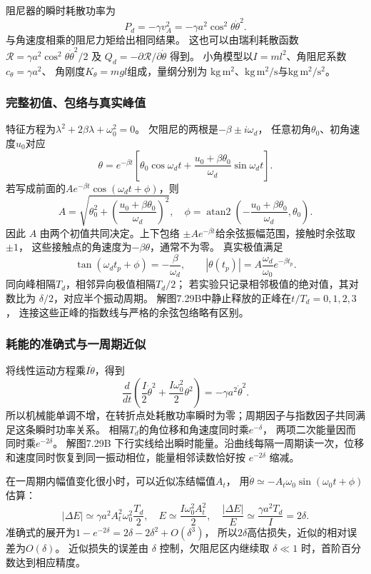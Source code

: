 \documentclass[UTF8,fontset=fandol,a4paper,11pt]{ctexart}
\begin{document}
阻尼器的瞬时耗散功率为
\[
P_d=-\gamma v_A^2=-\gamma a^2\cos^2\theta\dot\theta^2.
\]
与角速度相乘的阻尼力矩给出相同结果。
这也可以由瑞利耗散函数
$\mathcal R=\gamma a^2\cos^2\theta\dot\theta^2/2$
及 $Q_d=-\partial\mathcal R/\partial\dot\theta$ 得到。
小角模型以$I=ml^2$、角阻尼系数$c_\theta=\gamma a^2$、
角刚度$K_\theta=mgl$组成，量纲分别为
$\mathrm{kg\,m^2}$、$\mathrm{kg\,m^2/s}$与$\mathrm{kg\,m^2/s^2}$。

\subsubsection*{完整初值、包络与真实峰值}
特征方程为$\lambda^2+2\beta\lambda+\omega_0^2=0$。
欠阻尼的两根是$-\beta\pm i\omega_d$，
任意初角$\theta_0$、初角速度$u_0$对应
\[
\theta=e^{-\beta t}\left[
\theta_0\cos\omega_dt+\frac{u_0+\beta\theta_0}{\omega_d}\sin\omega_dt\right].
\]
若写成前面的$Ae^{-\beta t}\cos(\omega_dt+\phi)$，则
\[
A=\sqrt{\theta_0^2+\left(\frac{u_0+\beta\theta_0}{\omega_d}\right)^2},
\quad\phi=\operatorname{atan2}\left(-\frac{u_0+\beta\theta_0}{\omega_d},\theta_0\right).
\]
因此 $A$ 由两个初值共同决定。上下包络 $\pm Ae^{-\beta t}$给余弦振幅范围，接触时余弦取 $\pm1$，
这些接触点的角速度为$-\beta\theta$，通常不为零。
真实极值满足
\[
\tan(\omega_dt_p+\phi)=-\frac\beta{\omega_d},\qquad
|\theta(t_p)|=A\frac{\omega_d}{\omega_0}e^{-\beta t_p}.
\]
同向峰相隔$T_d$，相邻异向极值相隔$T_d/2$；
若实验只记录相邻极值的绝对值，其对数比为 $\delta/2$，对应半个振动周期。
解图7.29B中静止释放的正峰在$t/T_d=0,1,2,3$，
连接这些正峰的指数线与严格的余弦包络略有区别。

\subsubsection*{耗能的准确式与一周期近似}
将线性运动方程乘$I\dot\theta$，得到
\[
\frac{d}{dt}\left(\frac I2\dot\theta^2+\frac{I\omega_0^2}2\theta^2\right)
=-\gamma a^2\dot\theta^2.
\]
所以机械能单调不增，在转折点处耗散功率瞬时为零；周期因子与指数因子共同满足这条瞬时功率关系。
相隔$T_d$的角位移和角速度同时乘$e^{-\delta}$，
两项二次能量因而同时乘$e^{-2\delta}$。
解图7.29B 下行实线给出瞬时能量。沿曲线每隔一周期读一次，位移和速度同时恢复到同一振动相位，能量相邻读数恰好按 $e^{-2\delta}$ 缩减。

在一周期内幅值变化很小时，可以近似冻结幅值$A_t$，
用$\dot\theta\simeq-A_t\omega_0\sin(\omega_0t+\phi)$估算：
\[
|\Delta E|\simeq\gamma a^2 A_t^2\omega_0^2\frac{T_d}{2},\quad
E\simeq\frac{I\omega_0^2A_t^2}{2},\quad
\frac{|\Delta E|}{E}\simeq\frac{\gamma a^2T_d}{I}=2\delta.
\]
准确式的展开为$1-e^{-2\delta}=2\delta-2\delta^2+O(\delta^3)$，
所以$2\delta$高估损失，近似的相对误差为$O(\delta)$。
近似损失的误差由 $\delta$ 控制，欠阻尼区内继续取 $\delta\ll1$ 时，首阶百分数达到相应精度。
\end{document}
